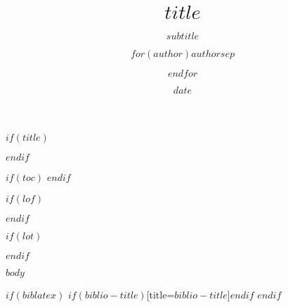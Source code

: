 \documentclass[$if(fontsize)$$fontsize$,$endif$$if(lang)$$babel-lang$,$endif$$if(papersize)$$papersize$,$endif$$for(classoption)$$classoption$$sep$,$endfor$]{$documentclass$}
\title{$title$}
\subtitle{$subtitle$}
\author{$for(author)$$author$$sep$ \and $endfor$}
\date{$date$}
\begin{document}
$if(title)$
\maketitle
$endif$

$if(toc)$
\tableofcontents
$endif$

$if(lof)$
\listoffigures
$endif$

$if(lot)$
\listoftables
$endif$

$body$

$if(biblatex)$
\printbibliography$if(biblio-title)$[title=$biblio-title$]$endif$
$endif$
\end{document}
